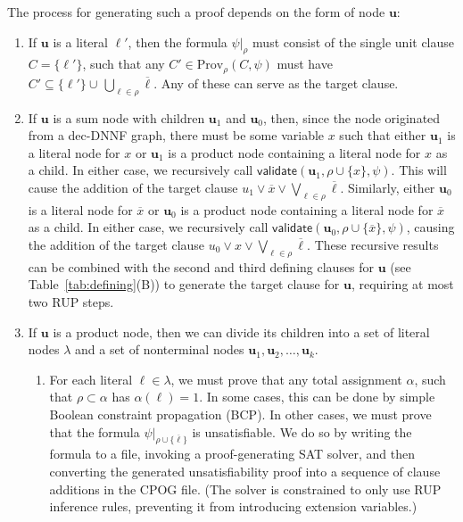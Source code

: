 \documentclass[twoside,11pt]{article}
\newcommand{\obar}[1]{\overline{#1}}
\newcommand{\lit}{\ell}
\newcommand{\passign}{\rho}
\newcommand{\validate}{\textsf{validate}}
\newcommand{\prov}{\textrm{Prov}}
\newcommand{\makenode}[1]{\mathbf{#1}}
\newcommand{\nodeu}{\makenode{u}}
\newcommand{\simplify}[2]{#1|_{#2}}
\begin{document}
The process for generating such a proof depends on the form of node $\nodeu$:
\begin{enumerate}
\item If $\nodeu$ is a literal $\lit'$, then the formula
  $\simplify{\psi}{\passign}$ must consist of the single unit clause
  $C = \{\lit'\}$, such that any $C' \in \prov_{\passign}(C, \psi)$ must have $C' \subseteq \{ \lit' \} \cup\, \bigcup_{\lit \in \passign} \obar{\lit}$.
  Any of these can
  serve as the target clause.
\item If $\nodeu$ is a sum node with children $\nodeu_1$ and $\nodeu_0$,
  then, since the node originated from a dec-DNNF graph, there must be
  some variable $x$ such that either $\nodeu_1$ is a literal node for $x$ or $\nodeu_1$ is a
  product node containing a literal node for $x$ as a child.  In either case, we
  recursively call $\validate(\nodeu_1, \passign \cup \{ x \}, \psi)$.
  This will cause the addition of the target clause
  $u_1 \lor \obar{x} \lor \bigvee_{\lit \in \passign} \obar{\lit}$.
Similarly, either $\nodeu_0$ is a literal node for $\obar{x}$ or $\nodeu_0$ is a product node containing a literal node for $\obar{x}$ as
  a child.  In either case, we recursively call $\validate(\nodeu_0, \passign \cup \{ \obar{x} \}, \psi)$,
  causing the addition of the target clause
  $u_0 \lor x \lor \bigvee_{\lit \in \passign} \obar{\lit}$.
  These recursive results can be combined with the second and third defining clauses for $\nodeu$
(see Table~\ref{tab:defining}(B))
  to generate the target clause for $\nodeu$, requiring at most two RUP steps.
\item If $\nodeu$ is a product node, then we can divide its children
  into a set of literal nodes $\lambda$ and a set of nonterminal nodes $\nodeu_1, \nodeu_2, \ldots, \nodeu_k$.
  \begin{enumerate}
    \item For each literal
  $\lit \in \lambda$, we must prove that any total assignment $\alpha$, such that
  $\passign \subset \alpha$ has $\alpha(\lit) = 1$.  In some
  cases, this can be done by simple Boolean constraint propagation (BCP).
  In other cases, we must prove that the formula
  $\simplify{\psi}{\passign \cup \{\obar{\lit}\}}$ is unsatisfiable.  We
  do so by writing the formula to a file, invoking a proof-generating
  SAT solver, and then converting the generated unsatisfiability proof
  into a sequence of clause additions in the CPOG file.
  (The solver is constrained to only use RUP inference rules, preventing it from introducing extension variables.)

\end{enumerate}
\end{enumerate}
\end{document}

